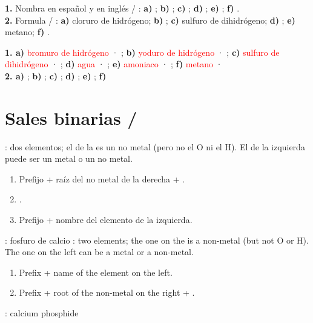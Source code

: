 \begin{exercise}
    \textbf{1.} Nombra en español y en inglés / : \textbf{a)} ; \textbf{b)} ; \textbf{c)} ; \textbf{d)} ; \textbf{e)} ; \textbf{f)} .\\
    \textbf{2.} Formula / : \textbf{a)} cloruro de hidrógeno; \textbf{b)} ; \textbf{c)} sulfuro de dihidrógeno; \textbf{d)} ; \textbf{e)} metano; \textbf{f)} .
    \begin{solu}
        \textbf{1. a)} \textcolor{red}{bromuro de hidrógeno} · \textcolor{red}{}; \textbf{b)} \textcolor{red}{yoduro de hidrógeno} · \textcolor{red}{}; \textbf{c)} \textcolor{red}{sulfuro de dihidrógeno} · \textcolor{red}{}; \textbf{d)} \textcolor{red}{agua} · \textcolor{red}{}; \textbf{e)} \textcolor{red}{amoniaco} · \textcolor{red}{}; \textbf{f)} \textcolor{red}{metano} · \textcolor{red}{}\\
        \textbf{2. a)} \textcolor{red}{}; \textbf{b)} \textcolor{red}{}; \textbf{c)} \textcolor{red}{}; \textbf{d)} \textcolor{red}{}; \textbf{e)} \textcolor{red}{}; \textbf{f)} \textcolor{red}{}
    \end{solu}
\end{exercise}

\section{Sales binarias / }

\begin{reglas}
    : dos elementos; el de la  es un no metal (pero no el O ni el H). El de la izquierda puede ser un metal o un no metal.
    \begin{enumerate}[label=\numberballgreen]
        \item Prefijo + raíz del no metal de la derecha + .
        \item {}.
        \item Prefijo + nombre del elemento de la izquierda.
    \end{enumerate}
    : fosfuro de calcio
    \ingles
    : two elements; the one on the  is a non-metal (but not O or H). The one on the left can be a metal or a non-metal.
    \begin{enumerate}[label=\numberballgreen]
        \item Prefix + name of the element on the left.
        \item Prefix + root of the non-metal on the right + .
    \end{enumerate}
    : calcium phosphide
\end{reglas}

